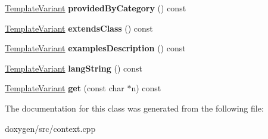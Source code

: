 \begin{DoxyCompactItemize}
\mbox{\label{class_translate_context_1_1_private_a4672f142d48affe041c5aec29f949e77}} 
\mbox{\hyperlink{class_template_variant}{Template\+Variant}} {\bfseries provided\+By\+Category} () const
\item 
\mbox{\label{class_translate_context_1_1_private_a07ceb11c07e4890518718a43bf7ba7c5}} 
\mbox{\hyperlink{class_template_variant}{Template\+Variant}} {\bfseries extends\+Class} () const
\item 
\mbox{\label{class_translate_context_1_1_private_ab1540c1db1427be54aa72d4d26e398a9}} 
\mbox{\hyperlink{class_template_variant}{Template\+Variant}} {\bfseries examples\+Description} () const
\item 
\mbox{\label{class_translate_context_1_1_private_a07d8826d2d733a682e0a66397609b4fc}} 
\mbox{\hyperlink{class_template_variant}{Template\+Variant}} {\bfseries lang\+String} () const
\item 
\mbox{\label{class_translate_context_1_1_private_a7cc01fb36e145068e8ba34357fe2d0c0}} 
\mbox{\hyperlink{class_template_variant}{Template\+Variant}} {\bfseries get} (const char $\ast$n) const
\end{DoxyCompactItemize}


The documentation for this class was generated from the following file\+:\begin{DoxyCompactItemize}
\item 
doxygen/src/context.\+cpp\end{DoxyCompactItemize}
